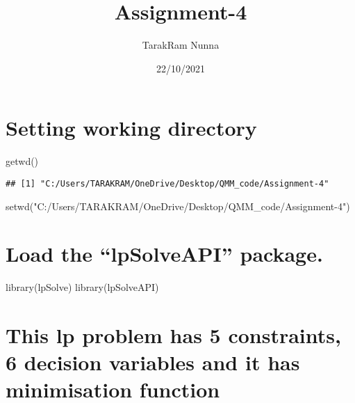 \documentclass[
]{article}
\title{Assignment-4}
\author{TarakRam Nunna}
\date{22/10/2021}
\newenvironment{Shaded}{\begin{snugshade}}{\end{snugshade}}
\newcommand{\FunctionTok}[1]{\textcolor[rgb]{0.00,0.00,0.00}{#1}}
\newcommand{\NormalTok}[1]{#1}
\newcommand{\StringTok}[1]{\textcolor[rgb]{0.31,0.60,0.02}{#1}}
\begin{document}
\maketitle

\hypertarget{setting-working-directory}{%
\section{Setting working directory}\label{setting-working-directory}}

\begin{Shaded}
\begin{Highlighting}[]
\FunctionTok{getwd}\NormalTok{()}
\end{Highlighting}
\end{Shaded}

\begin{verbatim}
## [1] "C:/Users/TARAKRAM/OneDrive/Desktop/QMM_code/Assignment-4"
\end{verbatim}

\begin{Shaded}
\begin{Highlighting}[]
\FunctionTok{setwd}\NormalTok{(}\StringTok{"C:/Users/TARAKRAM/OneDrive/Desktop/QMM\_code/Assignment{-}4"}\NormalTok{)}
\end{Highlighting}
\end{Shaded}

\hypertarget{load-the-lpsolveapi-package.}{%
\section{Load the ``lpSolveAPI''
package.}\label{load-the-lpsolveapi-package.}}

\begin{Shaded}
\begin{Highlighting}[]
\FunctionTok{library}\NormalTok{(lpSolve)}
\FunctionTok{library}\NormalTok{(lpSolveAPI)}
\end{Highlighting}
\end{Shaded}

\hypertarget{this-lp-problem-has-5-constraints-6-decision-variables-and-it-has-minimisation-function}{%
\section{This lp problem has 5 constraints, 6 decision variables and it
has minimisation
function}\label{this-lp-problem-has-5-constraints-6-decision-variables-and-it-has-minimisation-function}}
\end{document}
